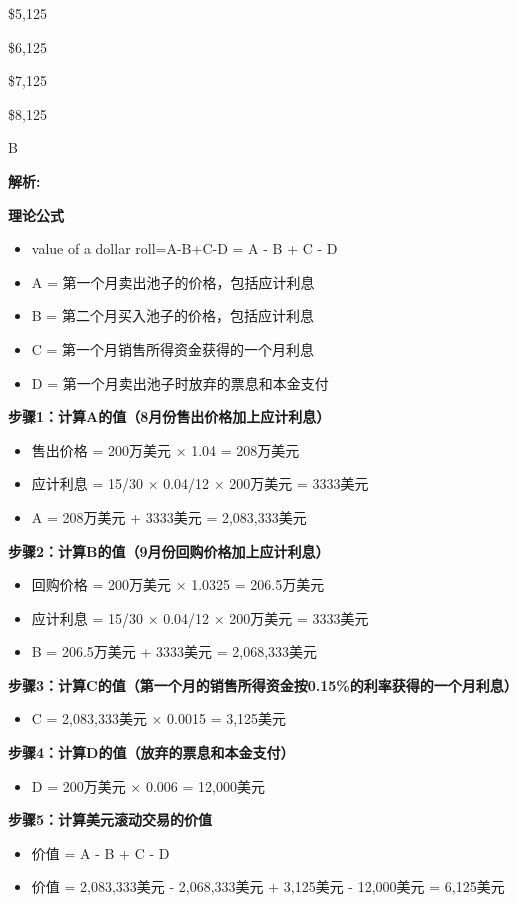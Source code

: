 \documentclass{article}
\newenvironment{explanation}
{\textbf{解析:}\par}
{\par}
\begin{document}
\begin{choices}
    \item \$5,125
    \item \$6,125
    \item \$7,125
    \item \$8,125
\end{choices}
    \begin{correctanswer}
    B
    \end{correctanswer}
    \begin{explanation}
    \textbf{理论公式}
    \begin{itemize}
    \item value of a dollar roll=A-B+C-D = A - B + C - D
    \item A = 第一个月卖出池子的价格，包括应计利息
    \item B = 第二个月买入池子的价格，包括应计利息
    \item C = 第一个月销售所得资金获得的一个月利息
    \item D = 第一个月卖出池子时放弃的票息和本金支付
    \end{itemize}


    \textbf{步骤1：计算A的值（8月份售出价格加上应计利息）}
    \begin{itemize}
        \item 售出价格 = 200万美元 × 1.04 = 208万美元
        \item 应计利息 = 15/30 × 0.04/12 × 200万美元 = 3333美元
        \item A = 208万美元 + 3333美元 = 2,083,333美元
    \end{itemize}
    
    \textbf{步骤2：计算B的值（9月份回购价格加上应计利息）}
    \begin{itemize}
        \item 回购价格 = 200万美元 × 1.0325 = 206.5万美元
        \item 应计利息 = 15/30 × 0.04/12 × 200万美元 = 3333美元
        \item B = 206.5万美元 + 3333美元 = 2,068,333美元
    \end{itemize}
    
    \textbf{步骤3：计算C的值（第一个月的销售所得资金按0.15\%的利率获得的一个月利息）}
    \begin{itemize}
        \item C = 2,083,333美元 × 0.0015 = 3,125美元
    \end{itemize}
    
    \textbf{步骤4：计算D的值（放弃的票息和本金支付）}
    \begin{itemize}
        \item D = 200万美元 × 0.006 = 12,000美元
    \end{itemize}
    
    \textbf{步骤5：计算美元滚动交易的价值}
    \begin{itemize}
        \item 价值 = A - B + C - D
        \item 价值 = 2,083,333美元 - 2,068,333美元 + 3,125美元 - 12,000美元 = 6,125美元
    \end{itemize}

\end{explanation}
\end{document}
